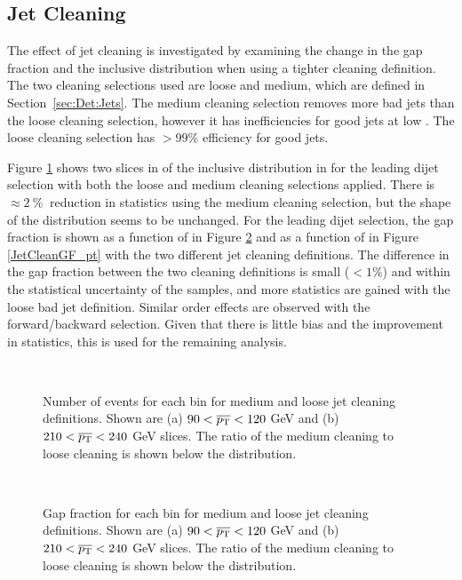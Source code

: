 \subsection{Jet Cleaning}
\label{sec:GBJ1:Cleaning}

The effect of jet cleaning is investigated by examining the change in the gap fraction and the inclusive distribution when using a tighter cleaning definition. 
The two cleaning selections used are loose and medium, which are defined in Section~\ref{sec:Det:Jets}.
The medium cleaning selection removes more bad jets than the loose cleaning selection, however it has inefficiencies for good jets at low \pt{}.
The loose cleaning selection has $>99\%$ efficiency for good jets.

Figure \ref{JetCleanIncl_dy} shows two slices in \ptb{} of the inclusive distribution in \dy{} for the leading \pt{} dijet selection with both the loose and medium cleaning selections applied. 
There is $\approx 2\: \%\: $ reduction in statistics using the medium cleaning selection, but the shape of the distribution seems to be unchanged.  
For the leading \pt{} dijet selection, the gap fraction is shown as a function of \ptb{} in Figure \ref{JetCleanGF_dy} and as a function of \dy{} in Figure \ref{JetCleanGF_pt} with the two different jet cleaning definitions. 
The difference in the gap fraction between the two cleaning definitions is small ($<1\%$) and within the statistical uncertainty of the samples, and more statistics are gained with the loose bad jet definition.
Similar order effects are observed with the forward/backward selection.
Given that there is little bias and the improvement in statistics, this is used for the remaining analysis. 


\begin{figure}
\centering
\mbox{
              \quad
              \quad
                              }
\caption[Effect of jet cleaning on the inclusive distribution in \dy{}]{
Number of events for each \dy{} bin for medium and loose jet cleaning definitions. 
Shown are (a) $90<\mbox{$\overline{p_{\rm T}}$}{}<120$ GeV and (b) $210<\mbox{$\overline{p_{\rm T}}$}{}<240$ GeV slices.
The ratio of the medium cleaning to loose cleaning is shown below the distribution.
\label{JetCleanIncl_dy}}
\end{figure}

\begin{figure}
\centering
\mbox{
              \quad
              \quad
                              }
\caption[Effect of jet cleaning on the gap fraction versus \ptb{}]{
Gap fraction for each \dy{} bin for medium and loose jet cleaning definitions. 
Shown are (a) $90<\mbox{$\overline{p_{\rm T}}$}{}<120$ GeV and (b) $210<\mbox{$\overline{p_{\rm T}}$}{}<240$ GeV slices.
The ratio of the medium cleaning to loose cleaning is shown below the distribution.
\label{JetCleanGF_dy}}
\end{figure}



